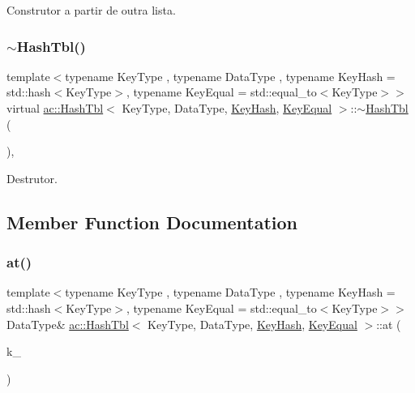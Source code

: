 Construtor a partir de outra lista. \mbox{\label{classac_1_1_hash_tbl_a5a82580a5f67dd0b0b90225b1090b751}} 
\subsubsection{\texorpdfstring{$\sim$\+Hash\+Tbl()}{~HashTbl()}}
{\footnotesize\ttfamily template$<$typename Key\+Type , typename Data\+Type , typename Key\+Hash  = std\+::hash$<$\+Key\+Type$>$, typename Key\+Equal  = std\+::equal\+\_\+to$<$\+Key\+Type$>$$>$ \\
virtual \hyperlink{classac_1_1_hash_tbl}{ac\+::\+Hash\+Tbl}$<$ Key\+Type, Data\+Type, \hyperlink{struct_key_hash}{Key\+Hash}, \hyperlink{struct_key_equal}{Key\+Equal} $>$\+::$\sim$\hyperlink{classac_1_1_hash_tbl}{Hash\+Tbl} (\begin{DoxyParamCaption}{ }\end{DoxyParamCaption})\hspace{0.3cm}{\ttfamily [inline]}, {\ttfamily [virtual]}}

Destrutor. 

\subsection{Member Function Documentation}
\mbox{\label{classac_1_1_hash_tbl_ac0933c629084aa2c996ecadc9dcee451}} 
\subsubsection{\texorpdfstring{at()}{at()}}
{\footnotesize\ttfamily template$<$typename Key\+Type , typename Data\+Type , typename Key\+Hash  = std\+::hash$<$\+Key\+Type$>$, typename Key\+Equal  = std\+::equal\+\_\+to$<$\+Key\+Type$>$$>$ \\
Data\+Type\& \hyperlink{classac_1_1_hash_tbl}{ac\+::\+Hash\+Tbl}$<$ Key\+Type, Data\+Type, \hyperlink{struct_key_hash}{Key\+Hash}, \hyperlink{struct_key_equal}{Key\+Equal} $>$\+::at (\begin{DoxyParamCaption}\item[{const Key\+Type \&}]{k\+\_\+ }\end{DoxyParamCaption})\hspace{0.3cm}{\ttfamily [inline]}}

